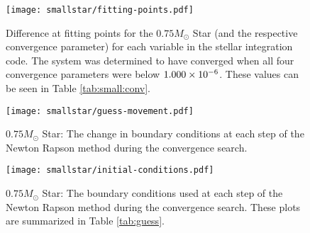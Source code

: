 \documentclass[10pt]{article}
\begin{document}
\begin{table}[htbp]
\begin{center}
\label{tab:small:conv}

 \end{center}
 \end{table}
 
 \begin{figure}[htbp]
    \centering
    \texttt{[image: smallstar/fitting-points.pdf]}
    \caption[$0.75 M_\odot$ Star: Gaps at Fitting Points]{Difference at fitting points for the $0.75 M_\odot$ Star (and the respective convergence parameter) for each variable in the stellar integration code. The system was determined to have converged when all four convergence parameters were below $1.000 \times 10^{-6}$. These values can be seen in Table \ref{tab:small:conv}.}
    \label{fig:small:conv}
 \end{figure}
 
  \begin{figure}[htbp]
    \centering
    \texttt{[image: smallstar/guess-movement.pdf]}
    \caption[$0.75 M_\odot$ Star: Boundary Point Movement]{$0.75 M_\odot$ Star: The change in boundary conditions at each step of the Newton Rapson method during the convergence search.}
    \label{fig:small:boundarydelta}
 \end{figure}
 \begin{figure}[htbp]
    \centering
    \texttt{[image: smallstar/initial-conditions.pdf]}
    \caption[$0.75 M_\odot$ Star: Boundary Points]{$0.75 M_\odot$ Star: The boundary conditions used at each step of the Newton Rapson method during the convergence search. These plots are summarized in Table \ref{tab:guess}.}
    \label{fig:small:boundary}
 \end{figure}
\end{document}
